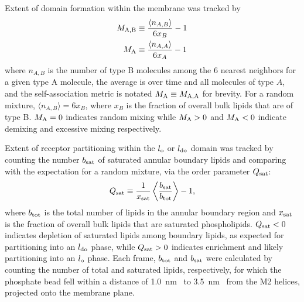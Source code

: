 Extent of domain formation within the membrane was tracked by 
    \begin{equation}
    \begin{aligned}
      M_{\mathrm{{A},{B}}} &\equiv \frac{\langle n_{A,B} \rangle} {6x_{B}} -1 \\
      M_{\mathrm{A}} &\equiv \frac{\langle n_{A,A} \rangle} {6x_{A}} -1 
    \end{aligned}
    \label{eq:M}
  \end{equation}
 where $n_{A,B}$ is the number of type B molecules among the 6 nearest neighbors for a given type A molecule,  the average is over time and all molecules of type $A$, and the self-association metric is notated $M_{\mathrm{A}} \equiv M_{\mathrm{{A},{A}}}$ for brevity. For a random mixture, $\langle n_{A,B} \rangle = 6x_{B}$, where $x_{B}$ is the fraction of overall bulk lipids that are of type B. ${M_{\mathrm{A}}=0}$ indicates random mixing while ${M_{\mathrm{A}}>0}$  and ${M_{\mathrm{A}}<0}$ indicate demixing and excessive mixing respectively.  


Extent of receptor partitioning within the $l_{\mathrm{o}}$ or $l_{\mathrm{do}}$ domain was tracked by counting the number $b_{\mathrm{sat}}$ of saturated annular boundary lipids and comparing with the expectation for a random mixture, via the order parameter $Q_{\mathrm{sat}}$:
  \begin{equation}
    \begin{aligned}
      Q_{\mathrm{sat}}\equiv \frac{1}{x_{\mathrm{sat}}}\left\langle\frac{  b_{\mathrm{sat}} }{b_{\mathrm{tot}} }\right\rangle-1,\\
    \end{aligned}
    \label{eq:Q}
  \end{equation}
  where $b_{\mathrm{tot}}$ is the total number of lipids in the annular boundary region and $x_{\mathrm{sat}}$ is the fraction of overall bulk lipids that are saturated phospholipids. $Q_{\mathrm{sat}} <0$ indicates depletion of saturated lipids among boundary lipids, as expected for partitioning into an $l_{\mathrm{do}}$ phase, while $Q_{\mathrm{sat}}>0$ indicates enrichment and likely partitioning into an $l_{\mathrm{o}}$ phase. Each frame, $b_{\mathrm{tot}}$ and $b_{\mathrm{sat}}$ were calculated by counting the number of total and saturated lipids, respectively, for which the phosphate bead fell within a distance of 1.0~nm~ to 3.5~nm~ from the M2 helices, projected onto the membrane plane. 
  
